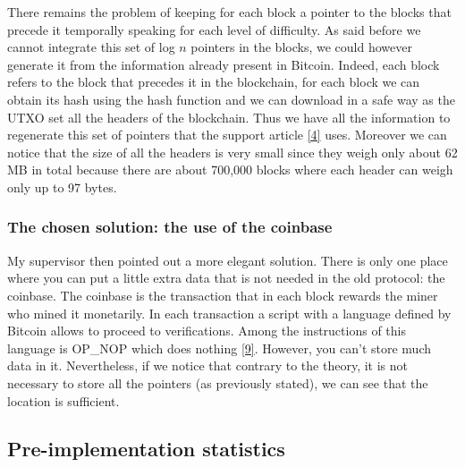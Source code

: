 \documentclass[12pt,a4paper]{article}
\newcommand{\source}[1]{\hyperlink{#1}{[#1]}}
\begin{document}
There remains the problem of keeping for each block a pointer to the blocks that precede it temporally speaking for each level of difficulty. As said before we cannot integrate this set of log $n$ pointers in the blocks, we could however generate it from the information already present in Bitcoin. Indeed, each block refers to the block that precedes it in the blockchain, for each block we can obtain its hash using the hash function and we can download in a safe way as the UTXO set all the headers of the blockchain. Thus we have all the information to regenerate this set of pointers that the support article \source{4} uses. Moreover we can notice that the size of all the headers is very small since they weigh only about 62 MB in total because there are about 700,000 blocks where each header can weigh only up to 97 bytes.\\

	\subsubsection{The chosen solution: the use of the coinbase}

	My supervisor then pointed out a more elegant solution. There is only one place where you can put a little extra data that is not needed in the old protocol: the coinbase. The coinbase is the transaction that in each block rewards the miner who mined it monetarily. In each transaction a script with a language defined by Bitcoin allows to proceed to verifications. Among the instructions of this language is OP\_NOP which does nothing \source{9}. However, you can't store much data in it. Nevertheless, if we notice that contrary to the theory, it is not necessary to store all the pointers (as previously stated), we can see that the location is sufficient.
	
	\subsection{Pre-implementation statistics}
	
\end{document}
